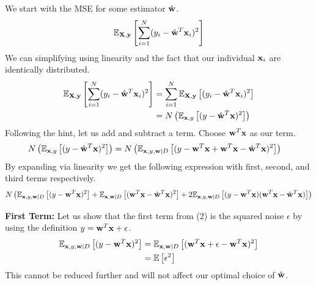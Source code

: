 \documentclass[submit]{harvardml}
\newcommand{\what}{\hat{\vb{w}}}
\newcommand{\E}{\mathbb{E}}
\begin{document}
We start with the MSE for some estimator $\what$.
\begin{equation*}
    \E_{\vb{X}, \vb{y}}\left[\sum_{i=1}^N (y_i - \what^T \vb{x}_i)^2\right]
\end{equation*}
We can simplifying using linearity and the fact that our individual $\vb{x}_i$ are identically distributed.
\begin{align*}
    \E_{\vb{X}, \vb{y}}\left[\sum_{i=1}^N (y_i - \what^T \vb{x}_i)^2\right] &= \sum_{i=1}^N \E_{\vb{X}, \vb{y}}\left[(y_i - \what^T \vb{x}_i)^2\right]\\
    &= N \left( \E_{\vb{x}, y}\left[(y - \what^T \vb{x})^2\right] \right)
\end{align*}
Following the hint, let us add and subtract a term. Choose $\vb{w}^T \vb{x}$ as our term.
\begin{align*}
    N \left( \E_{\vb{x}, y}\left[(y - \what^T \vb{x})^2\right] \right) &= N \left( \E_{\vb{x}, y, \vb{w} | D}\left[(y - \vb{w}^T\vb{x} + \vb{w}^T\vb{x} - \what^T \vb{x})^2\right] \right)
\end{align*}
By expanding via linearity we get the following expression with first, second, and third terms respectively.
\begin{equation}
    N \left( \E_{\vb{x}, y, \vb{w} | D}\left[(y - \vb{w}^T\vb{x})^2\right] + \E_{\vb{x}, \vb{w} | D}\left[(\vb{w}^T\vb{x} - \what^T \vb{x})^2\right] + 2 \E_{\vb{x}, y, \vb{w} | D}\left[(y - \vb{w}^T\vb{x})(\vb{w}^T\vb{x} - \what^T \vb{x})\right] \right)
\end{equation}

\textbf{First Term:} Let us show that the first term from (2) is the squared noise $\epsilon$ by using the definition $y = \vb{w}^T \vb{x} + \epsilon$.
\begin{align*}
    \E_{\vb{x}, y, \vb{w} | D}\left[(y - \vb{w}^T\vb{x})^2\right] &= \E_{\vb{x}, \vb{w} | D}\left[(\vb{w}^T \vb{x} + \epsilon - \vb{w}^T\vb{x})^2\right] \\
    &= \E \left[ \epsilon^2 \right]
\end{align*}
This cannot be reduced further and will not affect our optimal choice of $\what$.
\end{document}
